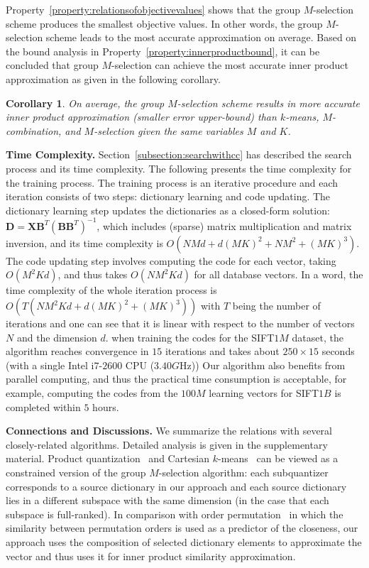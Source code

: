 \documentclass[10pt, letterpaper]{article}
\newtheorem{Corollary}{Corollary}
\begin{document}
Property~\ref{property:relationsofobjectivevalues} shows
that the group $M$-selection scheme produces
the smallest objective values.
In other words,
the group $M$-selection scheme leads to the most accurate approximation
on average.
Based on the bound analysis
in Property~\ref{property:innerproductbound},
it can be concluded
that group $M$-selection
can achieve the most accurate inner product approximation
as given in the following corollary.

\begin{Corollary}
\label{corollary:gruopmselectionisbest}
On average, the group $M$-selection scheme
results in more accurate inner product approximation
(smaller error upper-bound)
than $k$-means, $M$-combination, and $M$-selection
given the same variables $M$ and $K$.
\end{Corollary}

\noindent\textbf{Time Complexity.}
Section~\ref{subsection:searchwithcc} has described the search process
and its time complexity.
The following
presents the time complexity for the training process.
The training process is an iterative procedure
and each iteration consists of two steps:
dictionary learning
and code updating.
The dictionary learning step updates the dictionaries
as a closed-form solution:
$\mathbf{D} = \mathbf{X}\mathbf{B}^T(\mathbf{B}\mathbf{B}^T)^{-1}$,
which includes (sparse) matrix multiplication and matrix inversion,
and its time complexity is
$O(NMd + d (MK)^2 + NM^2 + (MK)^3)$.
The code updating step involves computing the code for each vector, taking $O(M^2Kd)$,
and thus takes $O(NM^2Kd)$ for all database vectors.
In a word,
the time complexity of
the whole iteration process
is $O(T(NM^2Kd + d (MK)^2 + (MK)^3))$
with $T$ being the number of iterations
and one can see that it is linear with respect to the number of vectors $N$
and the dimension $d$.
when training the codes for the SIFT$1M$ dataset,
the algorithm reaches convergence in $15$ iterations
and takes about $250 \times 15$ seconds (with a single Intel i$7$-$2600$ CPU ($3.40G$Hz))
Our algorithm also benefits from parallel computing,
and thus the practical time consumption is acceptable,
for example,
computing the codes from the $100M$ learning vectors for SIFT$1B$
is completed within $5$ hours.






\noindent\textbf{Connections and Discussions.}
We summarize the relations with several closely-related algorithms.
Detailed analysis
is given in the supplementary material.
Product quantization~\cite{JegouDS11} and Cartesian $k$-means~\cite{NorouziF13}
can be viewed as a constrained version of the group $M$-selection algorithm:
each subquantizer corresponds to
a source dictionary in our approach
and each source dictionary lies in a different subspace
with the same dimension (in the case that each subspace is full-ranked).
In comparison with order permutation~\cite{ChavezFN08}
in which the similarity between permutation orders
is used as a predictor of the closeness,
our approach uses the composition of selected dictionary elements
to approximate the vector
and thus uses it for inner product similarity approximation.
\end{document}
